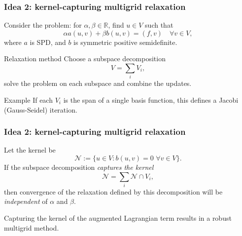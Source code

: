 \documentclass[presentation, 10pt]{beamer}
\begin{document}
\begin{frame}[t]
  \frametitle{Idea 2: kernel-capturing multigrid relaxation}
  Consider the problem: for $\alpha, \beta \in \mathbb{R}$, find $u \in V$ such that
  \begin{equation*}
    \alpha a(u, v) + \beta b(u, v) = (f, v) \quad \forall v \in V,
  \end{equation*}
  where $a$ is SPD, and $b$ is symmetric positive semidefinite.

  \begin{block}{Relaxation method}
    \vspace{0.25\baselineskip}
    Choose a subspace decomposition
    \begin{equation*}
      V = \sum_i V_i,
    \end{equation*}
    solve the problem on each subspace and combine the updates.
  \end{block}
  \begin{exampleblock}{Example}
    \vspace{0.25\baselineskip}
    If each $V_i$ is the span of a single basis function, this defines a
    Jacobi (Gauss-Seidel) iteration.
  \end{exampleblock}
\end{frame}

\begin{frame}[t]
  \frametitle{Idea 2: kernel-capturing multigrid relaxation}
  \begin{theorem}
    \vspace{0.25\baselineskip}
    Let the kernel be
    \begin{equation*}
      \mathcal{N} := \{ u \in V : b(u, v) = 0 \,\, \forall v \in V \}.
    \end{equation*}
    If the subspace decomposition \emph{captures the kernel}
    \begin{equation*}
      \mathcal{N} = \sum_i \mathcal{N} \cap V_i,
    \end{equation*}
    then convergence of the relaxation defined by this decomposition
    will be \emph{independent} of $\alpha$ and $\beta$.
    \nocite{Schoeberl:1999,Lee:2007}
  \end{theorem}

  \begin{corollary}
    \vspace{0.25\baselineskip}
    Capturing the kernel of the augmented Lagrangian term results in a robust multigrid method.
  \end{corollary}
\end{frame}
\end{document}
